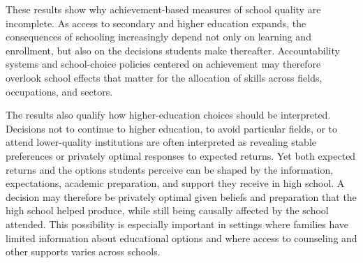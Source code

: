 \documentclass[a4paper, article, english, oneside, unknownkeysallowed, 12pt]{memoir}
\begin{document}
These results show why achievement-based measures of school quality are incomplete.
As access to secondary and higher education expands, the consequences of schooling increasingly depend not only on learning and enrollment, but also on the decisions students make thereafter.
Accountability systems and school-choice policies centered on achievement may therefore overlook school effects that matter for the allocation of skills across fields, occupations, and sectors.

The results also qualify how higher-education choices should be interpreted.
Decisions not to continue to higher education, to avoid particular fields, or to attend lower-quality institutions are often interpreted as revealing stable preferences or privately optimal responses to expected returns.
Yet both expected returns and the options students perceive can be shaped by the information, expectations, academic preparation, and support they receive in high school.
A decision may therefore be privately optimal given beliefs and preparation that the high school helped produce, while still being causally affected by the school attended.
This possibility is especially important in settings where families have limited information about educational options and where access to counseling and other supports varies across schools.


\clearpage
\printbibliography
\end{document}
